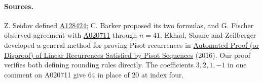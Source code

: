 \documentclass[11pt,letterpaper]{article}
\newcommand{\oeis}[1]{\href{https://oeis.org/A#1}{A#1}}
\begin{document}
\paragraph{Sources.}
Z. Seidov defined \oeis{128424}; C. Barker proposed its two formulas, and G. Fischer observed agreement with \oeis{020711} through \(n=41\). Ekhad, Sloane and Zeilberger developed a general method for proving Pisot recurrences in \href{https://arxiv.org/abs/1609.05570}{Automated Proof (or Disproof) of Linear Recurrences Satisfied by Pisot Sequences} (2016). Our proof verifies both defining rounding rules directly. The coefficients \(3,2,1,-1\) in one comment on A020711 give \(64\) in place of \(20\) at index four.
\end{document}
